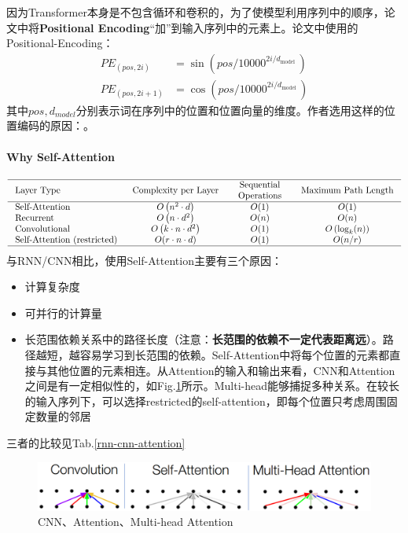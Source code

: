 因为Transformer本身是不包含循环和卷积的，为了使模型利用序列中的顺序，论文中将\textbf{Positional Encoding}“加”到输入序列中的元素上。论文中使用的Positional-Encoding：
$$
\begin{aligned}
	P E_{(p o s, 2 i)} &=\sin \left(p o s / 10000^{2 i / d_{\text {model }}}\right) \\
	P E_{(p o s, 2 i+1)} &=\cos \left(p o s / 10000^{2 i / d_{\text {model }}}\right)
\end{aligned}
$$
其中$pos,d_{model}$分别表示词在序列中的位置和位置向量的维度。作者选用这样的位置编码的原因：。

\paragraph{Why Self-Attention}
$$
\begin{array}{lccc}
	\hline \text { Layer Type } & \text { Complexity per Layer } & \begin{array}{c}
		\text { Sequential } \\
		\text { Operations }
	\end{array} & \text { Maximum Path Length } \\
	\hline \text { Self-Attention } & O\left(n^{2} \cdot d\right) & O(1) & O(1) \\
	\text { Recurrent } & O\left(n \cdot d^{2}\right) & O(n) & O(n) \\
	\text { Convolutional } & O\left(k \cdot n \cdot d^{2}\right) & O(1) & O\left(\log _{k}(n)\right) \\
	\text { Self-Attention (restricted) } & O(r \cdot n \cdot d) & O(1) & O(n / r) \\
	\hline
	\label{rnn-cnn-attention}
\end{array}
$$
与RNN/CNN相比，使用Self-Attention主要有三个原因：
\begin{itemize}
	\item 计算复杂度
	\item 可并行的计算量
	\item 长范围依赖关系中的路径长度（注意：\textbf{长范围的依赖不一定代表距离远}）。路径越短，越容易学习到长范围的依赖。Self-Attention中将每个位置的元素都直接与其他位置的元素相连。从Attention的输入和输出来看，CNN和Attention之间是有一定相似性的，如Fig.\ref{fig:cnn-attention-multi head}所示。Multi-head能够捕捉多种关系。在较长的输入序列下，可以选择restricted的self-attention，即每个位置只考虑周围固定数量的邻居
\end{itemize}
三者的比较见Tab.\ref{rnn-cnn-attention}
\begin{figure}[h]
	\centering
	\includegraphics[width=.8\textwidth]{pics/CNN-Attention-Multi head.png}
	\caption{CNN、Attention、Multi-head Attention}
	\label{fig:cnn-attention-multi head}
\end{figure}

